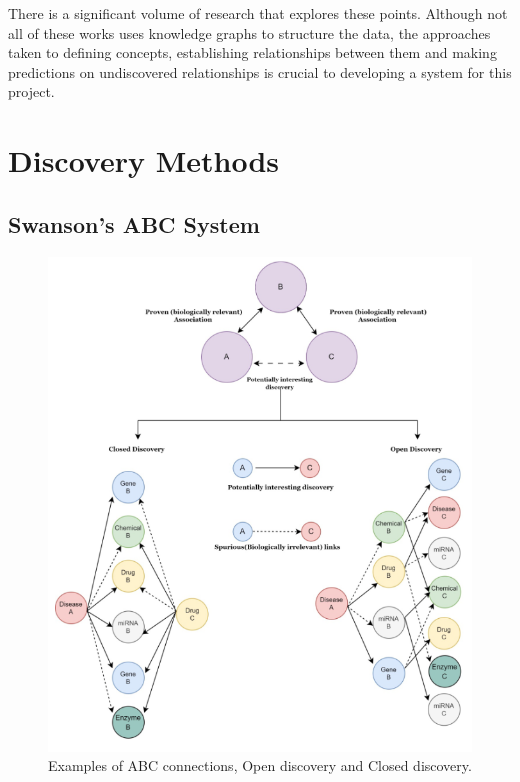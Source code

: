 \documentclass{l4proj}
\begin{document}
There is a significant volume of research that explores these points. Although not all of these works uses knowledge graphs to structure the data, the approaches taken to defining concepts, establishing relationships between them and making predictions on undiscovered relationships is crucial to developing a system for this project. \\

\section{Discovery Methods}

\subsection{Swanson's ABC System}

\begin{figure}
    \centering
    \includegraphics[width=\linewidth]{images/abc_open_closed.png}
    \caption{Examples of ABC connections, Open discovery and Closed discovery. \citep{bhasuran_literature_2023}}
    \label{fig:open_closed}
\end{figure}
\end{document}
